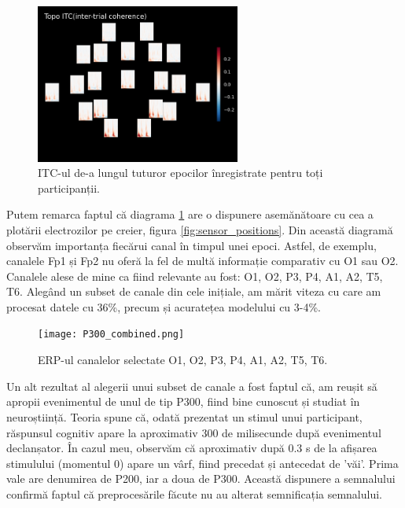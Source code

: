 \begin{figure}[H]
    \centering
		\vspace{-1em}
    \includegraphics[width=0.6\textwidth]{images/itc_epochs.png}
    \caption{ITC-ul de-a lungul tuturor epocilor înregistrate pentru toți participanții.}
		\vspace{-1em}
    \label{fig:itc}
\end{figure}

Putem remarca faptul că diagrama \ref{fig:itc} are o dispunere asemănătoare cu cea a plotării electrozilor pe creier, figura \ref{fig:sensor_positions}. Din această diagramă observăm importanța fiecărui canal în timpul unei epoci. Astfel, de exemplu, canalele Fp1 și Fp2 nu oferă la fel de multă informație comparativ cu O1 sau O2. Canalele alese de mine ca fiind relevante au fost: O1, O2, P3, P4, A1, A2, T5, T6. Alegând un subset de canale din cele inițiale, am mărit viteza cu care am procesat datele cu 36\%, precum și acuratețea modelului cu 3-4\%.

\vspace{1em}
\begin{figure}[H]
    \centering
		\vspace{-1em}
    \texttt{[image: P300\_combined.png]}
    \caption{ERP-ul canalelor selectate O1, O2, P3, P4, A1, A2, T5, T6.}
		\vspace{-1em}
    \label{fig:enter-label}
\end{figure}

Un alt rezultat al alegerii unui subset de canale a fost faptul că, am reușit să apropii evenimentul de unul de tip P300\cite{P300}, fiind bine cunoscut și studiat în neuroștiință. Teoria spune că, odată prezentat un stimul unui participant, răspunsul cognitiv apare la aproximativ 300 de milisecunde după evenimentul declanșator. În cazul meu, observăm că aproximativ după 0.3 s de la afișarea stimulului (momentul 0) apare un vârf, fiind precedat și antecedat de 'văi'. Prima vale are denumirea de P200, iar a doua de P300. Această dispunere a semnalului confirmă faptul că preprocesările făcute nu au alterat semnificația semnalului. %

